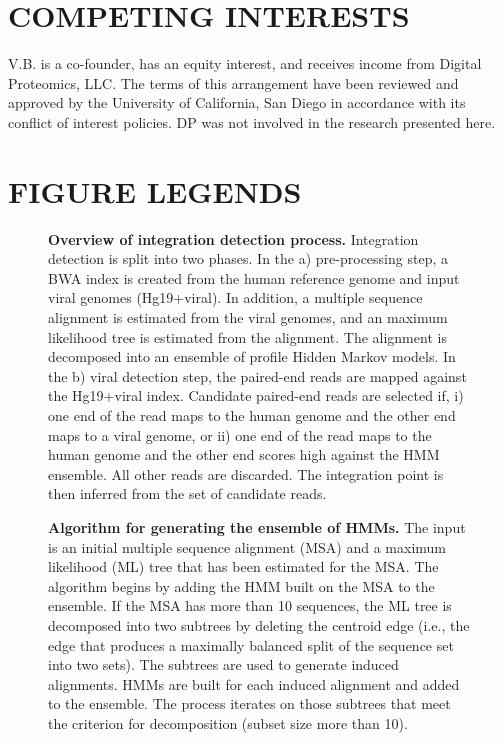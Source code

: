 \documentclass[a4,center,fleqn]{NAR}
\begin{document}
\section{COMPETING INTERESTS}
V.B. is a co-founder, has an equity interest, and receives income from Digital Proteomics, LLC. The terms of this arrangement have been reviewed and approved by the University of California, San Diego in accordance with its conflict of interest policies. DP was not involved in the research presented here.




\clearpage
\section{FIGURE LEGENDS}
\begin{figure}[htpb]
  \centering
\caption[Overview of integration detection process.]
{\label{flowchart}  {\bf Overview of integration detection process.}  Integration detection is split into two phases.  In the a) pre-processing step, a BWA index is created from the human reference genome and input viral genomes (Hg19+viral).  In addition, a multiple sequence alignment is estimated from the viral genomes, and an maximum likelihood tree is estimated from the alignment.  The alignment is decomposed into an ensemble of profile Hidden Markov models.  In the b) viral detection step, the paired-end reads are mapped against the Hg19+viral index.  Candidate paired-end reads are selected if, i) one end of the read maps to the human genome and the other end maps to a viral genome, or ii) one end of the read maps to the human genome and the other end scores high against the HMM ensemble.  All other reads are discarded.  The integration point is then inferred from the set of candidate reads.}
\end{figure}

\begin{figure}[htpb]
  \centering
\caption[Ensemble of HMMs technique.]
{\label{ehmms}  {\bf Algorithm for generating the ensemble of HMMs.}  The input is an initial multiple sequence alignment (MSA) and a maximum likelihood (ML) tree that has been estimated for the MSA. The algorithm begins by adding the HMM built on the MSA to the ensemble. If the MSA has more than 10 sequences, the ML tree is decomposed into two subtrees by deleting the centroid edge (i.e., the edge that produces a maximally balanced split of the sequence set into two sets). The subtrees are used to generate induced alignments. HMMs are built for each induced alignment and added to the ensemble. The process iterates on those subtrees that meet the criterion for decomposition (subset size more than 10).}
\end{figure}
\end{document}

